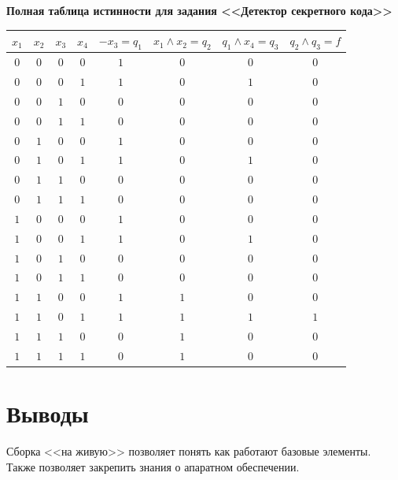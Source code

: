 \documentclass[oneside,a4paper,14pt]{extarticle} %
\begin{document}
	\noindent
	\textbf{Полная таблица истинности для задания <<Детектор секретного кода>>}
\begin{center}
\begin{tabular}{cccc|cccc}
$x_1$&$x_2$&$x_3$&$x_4$&$ -x_3=q_1$&$x_1 \wedge x_2=q_2$&$q_1 \wedge x_4=q_3$&$q_2 \wedge q_3=f$\\
\hline
$0$&$0$&$0$&$0$&$1$&$0$&$0$&$0$\\
$0$&$0$&$0$&$1$&$1$&$0$&$1$&$0$\\
$0$&$0$&$1$&$0$&$0$&$0$&$0$&$0$\\
$0$&$0$&$1$&$1$&$0$&$0$&$0$&$0$\\
$0$&$1$&$0$&$0$&$1$&$0$&$0$&$0$\\
$0$&$1$&$0$&$1$&$1$&$0$&$1$&$0$\\
$0$&$1$&$1$&$0$&$0$&$0$&$0$&$0$\\
$0$&$1$&$1$&$1$&$0$&$0$&$0$&$0$\\
$1$&$0$&$0$&$0$&$1$&$0$&$0$&$0$\\
$1$&$0$&$0$&$1$&$1$&$0$&$1$&$0$\\
$1$&$0$&$1$&$0$&$0$&$0$&$0$&$0$\\
$1$&$0$&$1$&$1$&$0$&$0$&$0$&$0$\\
$1$&$1$&$0$&$0$&$1$&$1$&$0$&$0$\\
$1$&$1$&$0$&$1$&$1$&$1$&$1$&$1$\\
$1$&$1$&$1$&$0$&$0$&$1$&$0$&$0$\\
$1$&$1$&$1$&$1$&$0$&$1$&$0$&$0$\\

\end{tabular}
\end{center}

	\section*{Выводы}
	Сборка <<на живую>> позволяет понять как работают базовые элементы.
	Также позволяет закрепить знания о апаратном обеспечении.
\end{document}
